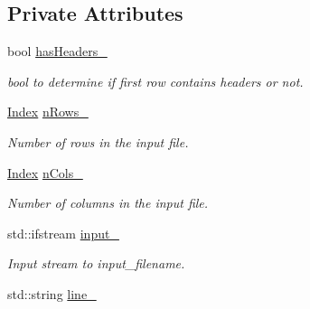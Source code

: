 \subsection*{Private Attributes}
\begin{DoxyCompactItemize}
\item 
\hypertarget{classCsvParser_abd8b856c78fe3ce8b32f1e6b0a390c84}{bool \hyperlink{classCsvParser_abd8b856c78fe3ce8b32f1e6b0a390c84}{has\-Headers\-\_\-}}\label{classCsvParser_abd8b856c78fe3ce8b32f1e6b0a390c84}

\begin{DoxyCompactList}\small\item\em bool to determine if first row contains headers or not. \end{DoxyCompactList}\item 
\hypertarget{classCsvParser_ad62252c05d21acdbb51ce29623efe9da}{\hyperlink{typedefs_8h_a2c726f8f32697958e9d6c2afecda531d}{Index} \hyperlink{classCsvParser_ad62252c05d21acdbb51ce29623efe9da}{n\-Rows\-\_\-}}\label{classCsvParser_ad62252c05d21acdbb51ce29623efe9da}

\begin{DoxyCompactList}\small\item\em Number of rows in the input file. \end{DoxyCompactList}\item 
\hypertarget{classCsvParser_aec28145f095ecbfb8dcec7a7fb90c382}{\hyperlink{typedefs_8h_a2c726f8f32697958e9d6c2afecda531d}{Index} \hyperlink{classCsvParser_aec28145f095ecbfb8dcec7a7fb90c382}{n\-Cols\-\_\-}}\label{classCsvParser_aec28145f095ecbfb8dcec7a7fb90c382}

\begin{DoxyCompactList}\small\item\em Number of columns in the input file. \end{DoxyCompactList}\item 
\hypertarget{classCsvParser_a418665bb33ded4f1ce88bedb60e3ffc0}{std\-::ifstream \hyperlink{classCsvParser_a418665bb33ded4f1ce88bedb60e3ffc0}{input\-\_\-}}\label{classCsvParser_a418665bb33ded4f1ce88bedb60e3ffc0}

\begin{DoxyCompactList}\small\item\em Input stream to {\itshape input\-\_\-filename}. \end{DoxyCompactList}\item 
\hypertarget{classCsvParser_aaeb353f8e1c649830268cfa5635eaa4f}{std\-::string \hyperlink{classCsvParser_aaeb353f8e1c649830268cfa5635eaa4f}{line\-\_\-}}\label{classCsvParser_aaeb353f8e1c649830268cfa5635eaa4f}


\end{DoxyCompactItemize}
